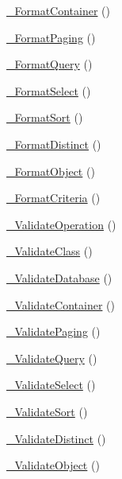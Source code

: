 \begin{DoxyCompactItemize}
\item 
\hyperlink{class_c_data_wrapper_a2e8e2a7f0e09c990932ae3d4b8903982}{\-\_\-\-Format\-Container} ()
\item 
\hyperlink{class_c_data_wrapper_abaf133a394b91405477d1e362496f74b}{\-\_\-\-Format\-Paging} ()
\item 
\hyperlink{class_c_data_wrapper_a0c3054fcf3716d638922cd581d5c706e}{\-\_\-\-Format\-Query} ()
\item 
\hyperlink{class_c_data_wrapper_a318ea202e1ec6a1bf0154165f2aa8576}{\-\_\-\-Format\-Select} ()
\item 
\hyperlink{class_c_data_wrapper_a040ed6e140436322b736744740cc8cbd}{\-\_\-\-Format\-Sort} ()
\item 
\hyperlink{class_c_data_wrapper_a51cd50654dd1b518c1aff08cfb9c7d46}{\-\_\-\-Format\-Distinct} ()
\item 
\hyperlink{class_c_data_wrapper_addefb7bd419de62bfebedc21abbdad7e}{\-\_\-\-Format\-Object} ()
\item 
\hyperlink{class_c_data_wrapper_a081597709126bc46a8ae4ed071b98fd4}{\-\_\-\-Format\-Criteria} ()
\item 
\hyperlink{class_c_data_wrapper_ac25dbab0dc8d55b3b8f0a4027d4549c6}{\-\_\-\-Validate\-Operation} ()
\item 
\hyperlink{class_c_data_wrapper_a0d2d8f118bf073be5d8821632d423ef5}{\-\_\-\-Validate\-Class} ()
\item 
\hyperlink{class_c_data_wrapper_a28268d756311188bc77b980823e389c4}{\-\_\-\-Validate\-Database} ()
\item 
\hyperlink{class_c_data_wrapper_a7a6620a2b6ef1de3dfad673b4d977da1}{\-\_\-\-Validate\-Container} ()
\item 
\hyperlink{class_c_data_wrapper_a794047412591b0e4dac24c5c3c93c027}{\-\_\-\-Validate\-Paging} ()
\item 
\hyperlink{class_c_data_wrapper_a647874d1600ca237ec5d6697730f2f00}{\-\_\-\-Validate\-Query} ()
\item 
\hyperlink{class_c_data_wrapper_ad62b183dc761424941781da00b616610}{\-\_\-\-Validate\-Select} ()
\item 
\hyperlink{class_c_data_wrapper_a42d14abef174cd5eddee8e050faf3268}{\-\_\-\-Validate\-Sort} ()
\item 
\hyperlink{class_c_data_wrapper_a08197265c8169d9780b19b226327a5fd}{\-\_\-\-Validate\-Distinct} ()
\item 
\hyperlink{class_c_data_wrapper_a8e8a0302f088adf0349bd6bb7110bffb}{\-\_\-\-Validate\-Object} ()
\item 

\end{DoxyCompactItemize}
